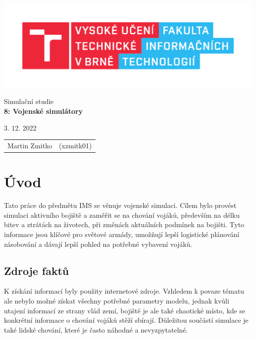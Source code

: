 \documentclass[a4paper, 11pt]{article}
\begin{document}
	\begin{titlepage}
		\begin{center}
			\includegraphics[width=0.8 \linewidth]{FIT_logo.pdf}


			\Huge{Simulační studie} \\
			\LARGE{\textbf{8: Vojenské simulátory}}

		\end{center}

		\begin{minipage}{0.5 \textwidth}
			\Large
			3. 12. 2022
		\end{minipage}
		\hfill
		\begin{minipage}[r]{0.5 \textwidth}
			\Large
			\begin{tabular}{ll}
			    Martin Zmitko & (xzmitk01)
			\end{tabular}
		\end{minipage}
	\end{titlepage}
	\clearpage

	\setcounter{page}{1}
	\tableofcontents
	\clearpage


	\section{Úvod}
    Tato práce do předmětu IMS se věnuje vojenské simulaci. Cílem bylo provést simulaci aktivního bojiště a zaměřit se na chování vojáků, především na délku bitev a ztrátách na životech, při změnách aktuálních podmínek na bojišti. Tyto informace jsou klíčové pro světové armády, umožňují lepší logistické plánování zásobování a dávají lepší pohled na potřebné vybavení vojáků.

	\subsection{Zdroje faktů}
    K získání informací byly použity internetové zdroje. Vzhledem k povaze tématu ale nebylo možné získat všechny potřebné parametry modelu, jednak kvůli utajení informací ze strany vlád zemí, bojiště je ale také chaotické místo, kde se konkrétní informace o chování vojáků stěží sbírají. Důležitou součástí simulace je také lidské chování, které je často náhodné a nevyzpytatelné.
\end{document}
